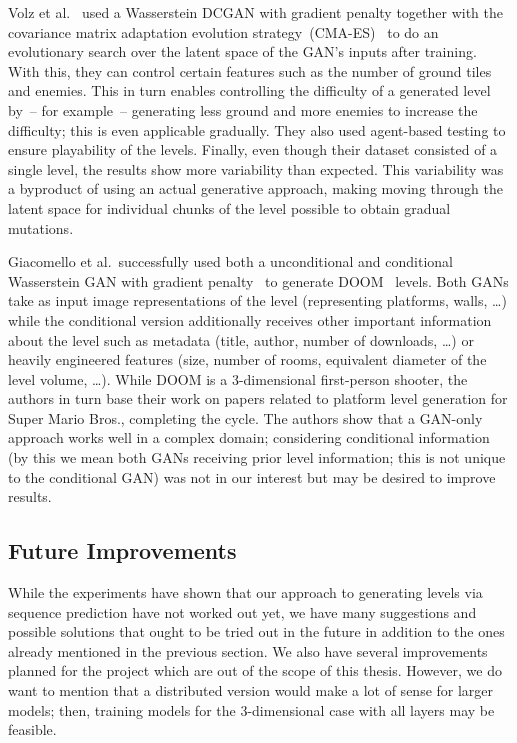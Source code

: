 Volz et
al.~\cite{volzEvolvingMarioLevels2018,thehedgeifyTheHedgeifyDagstuhlGAN2019}
used a Wasserstein DCGAN with gradient penalty together with the
covariance matrix adaptation evolution
strategy~(CMA-ES)~\cite{hansenCompletelyDerandomizedSelfAdaptation2006}
to do an evolutionary search over the latent space of the GAN's inputs
after training. With this, they can control certain features such as
the number of ground tiles and enemies. This in turn enables
controlling the difficulty of a generated level by~-- for example~--
generating less ground and more enemies to increase the difficulty;
this is even applicable gradually. They also used agent-based testing
to ensure playability of the levels. Finally, even though their
dataset consisted of a single level, the results show more variability
than expected. This variability was a byproduct of using an actual
generative approach, making moving through the latent space for
individual chunks of the level possible to obtain gradual mutations.

Giacomello et al.\ successfully used both a unconditional and
conditional Wasserstein GAN with gradient
penalty~\cite{gulrajaniImprovedTrainingWasserstein2017} to generate
DOOM~\cite{Doom1993Video2019} levels. Both GANs take as input image
representations of the level (representing platforms, walls, \dots)
while the conditional version additionally receives other important
information about the level such as metadata (title, author, number of
downloads, \dots) or heavily engineered features (size, number of
rooms, equivalent diameter of the level volume, \dots). While DOOM is
a 3-dimensional first-person shooter, the authors in turn base their
work on papers related to platform level generation for Super Mario
Bros., completing the cycle. The authors show that a GAN-only approach
works well in a complex domain; considering conditional information
(by this we mean both GANs receiving prior level information; this is
not unique to the conditional GAN) was not in our interest but may be
desired to improve results.

\subsection{Future Improvements}

While the experiments have shown that our approach to generating
levels via sequence prediction have not worked out yet, we have many
suggestions and possible solutions that ought to be tried out in the
future in addition to the ones already mentioned in the previous
section. We also have several improvements planned for the project
which are out of the scope of this thesis. However, we do want to
mention that a distributed version would make a lot of sense for
larger models; then, training models for the 3-dimensional case with
all layers may be feasible.

